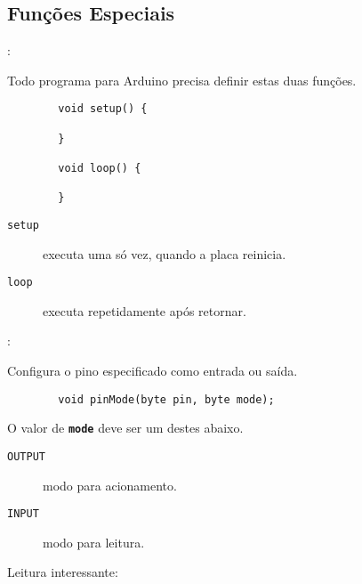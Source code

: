 \subsection{Funções Especiais}


\begin{frame}[fragile]{\insertsection: \insertsubsection}

	Todo programa para Arduino precisa definir estas duas funções.

	\begin{verbatim}
		void setup() {

		}

		void loop() {

		}
	\end{verbatim}

	\begin{description}
		\item[\texttt{setup}] executa uma só vez, quando a placa reinicia.
		\item[\texttt{loop}] executa repetidamente após \texttt{} retornar.
	\end{description}

\end{frame}


\begin{frame}[b,fragile]{\insertsection: \insertsubsection}

	Configura o pino especificado como entrada ou saída.
	\begin{verbatim}
		void pinMode(byte pin, byte mode);
	\end{verbatim}

	O valor de \texttt{\textbf{mode}} deve ser um destes abaixo.
	\begin{description}
		\item[\texttt{OUTPUT}] modo para acionamento.
		\item[\texttt{INPUT}] modo para leitura.
	\end{description}

	\vfill
	Leitura interessante: 

\end{frame}


